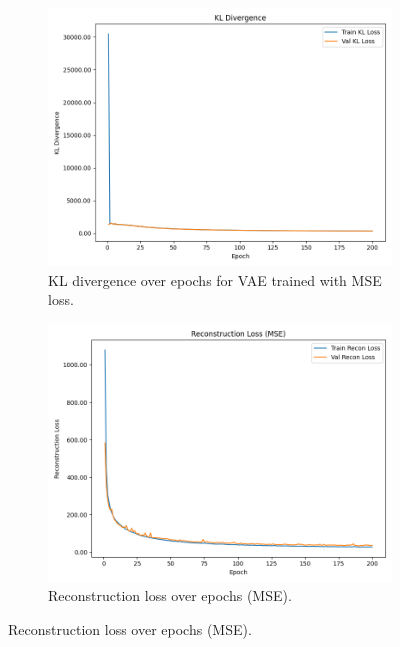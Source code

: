 \begin{figure}[htbp]
    \centering
    \begin{subfigure}[b]{0.45\textwidth}
        \includegraphics[width=\textwidth]{img/vae_results/200_epochs_128_ls_mse/mse_kl_loss.png}
        \caption{KL divergence over epochs for VAE trained with MSE loss.}
        \label{fig:mse_kl_loss}
    \end{subfigure}
    \hfill
    \begin{subfigure}[b]{0.45\textwidth}
        \includegraphics[width=\textwidth]{img/vae_results/200_epochs_128_ls_mse/mse_recon_loss.png}
        \caption{Reconstruction loss over epochs (MSE).}
        \label{fig:mse_recon_loss}
    \end{subfigure}
    

\end{figure}
